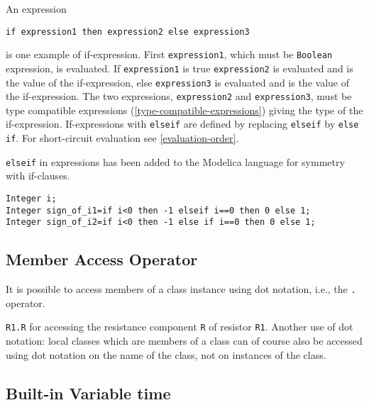 An expression
\begin{lstlisting}[language=modelica]
if expression1 then expression2 else expression3
\end{lstlisting}
is one example of if-expression. First \lstinline!expression1!, which must be
\lstinline!Boolean! expression, is evaluated. If \lstinline!expression1! is true \lstinline!expression2! is
evaluated and is the value of the if-expression, else \lstinline!expression3! is
evaluated and is the value of the if-expression. The two expressions,
\lstinline!expression2! and \lstinline!expression3!, must be type compatible expressions
(\cref{type-compatible-expressions}) giving the type of the if-expression. If-expressions with
\lstinline!elseif! are defined by replacing \lstinline!elseif! by \lstinline!else if!. For
short-circuit evaluation see \cref{evaluation-order}.

\begin{nonnormative}
\lstinline!elseif! in expressions has been added to the Modelica language for symmetry with if-clauses.
\end{nonnormative}

\begin{example}
\begin{lstlisting}[language=modelica]
Integer i;
Integer sign_of_i1=if i<0 then -1 elseif i==0 then 0 else 1;
Integer sign_of_i2=if i<0 then -1 else if i==0 then 0 else 1;
\end{lstlisting}
\end{example}

\subsection{Member Access Operator}\label{member-access-operator}

It is possible to access members of a class instance using dot notation,
i.e., the \lstinline!.! operator.

\begin{example}
\lstinline!R1.R! for accessing the resistance component \lstinline!R!
of resistor \lstinline!R1!. Another use of dot notation: local classes
which are members of a class can of course also be accessed using dot
notation on the name of the class, not on instances of the class.
\end{example}

\subsection{Built-in Variable time}\label{built-in-variable-time}

